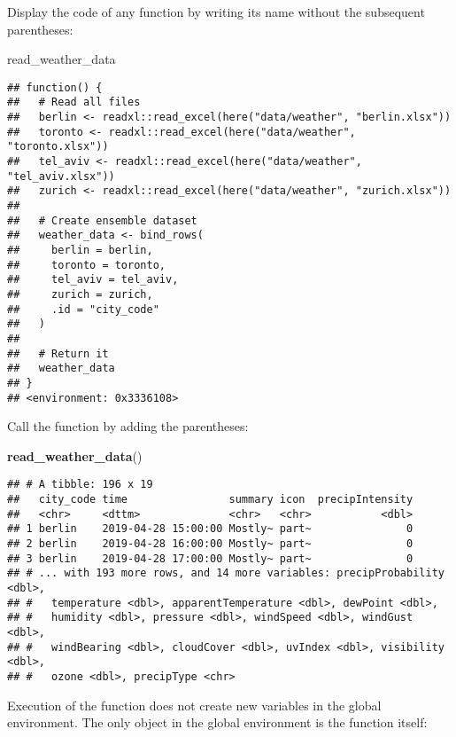 \documentclass[]{book}
\newenvironment{Shaded}{\begin{snugshade}}{\end{snugshade}}
\newcommand{\KeywordTok}[1]{\textcolor[rgb]{0.13,0.29,0.53}{\textbf{#1}}}
\newcommand{\NormalTok}[1]{#1}
\begin{document}
Display the code of any function by writing its name without the subsequent parentheses:

\begin{Shaded}
\begin{Highlighting}[]
\NormalTok{read_weather_data}
\end{Highlighting}
\end{Shaded}

\begin{verbatim}
## function() {
##   # Read all files
##   berlin <- readxl::read_excel(here("data/weather", "berlin.xlsx"))
##   toronto <- readxl::read_excel(here("data/weather", "toronto.xlsx"))
##   tel_aviv <- readxl::read_excel(here("data/weather", "tel_aviv.xlsx"))
##   zurich <- readxl::read_excel(here("data/weather", "zurich.xlsx"))
## 
##   # Create ensemble dataset
##   weather_data <- bind_rows(
##     berlin = berlin,
##     toronto = toronto,
##     tel_aviv = tel_aviv,
##     zurich = zurich,
##     .id = "city_code"
##   )
## 
##   # Return it
##   weather_data
## }
## <environment: 0x3336108>
\end{verbatim}

Call the function by adding the parentheses:

\begin{Shaded}
\begin{Highlighting}[]
\KeywordTok{read_weather_data}\NormalTok{()}
\end{Highlighting}
\end{Shaded}

\begin{verbatim}
## # A tibble: 196 x 19
##   city_code time                summary icon  precipIntensity
##   <chr>     <dttm>              <chr>   <chr>           <dbl>
## 1 berlin    2019-04-28 15:00:00 Mostly~ part~               0
## 2 berlin    2019-04-28 16:00:00 Mostly~ part~               0
## 3 berlin    2019-04-28 17:00:00 Mostly~ part~               0
## # ... with 193 more rows, and 14 more variables: precipProbability <dbl>,
## #   temperature <dbl>, apparentTemperature <dbl>, dewPoint <dbl>,
## #   humidity <dbl>, pressure <dbl>, windSpeed <dbl>, windGust <dbl>,
## #   windBearing <dbl>, cloudCover <dbl>, uvIndex <dbl>, visibility <dbl>,
## #   ozone <dbl>, precipType <chr>
\end{verbatim}

Execution of the function does not create new variables in the global environment.
The only object in the global environment is the function itself:
\end{document}
